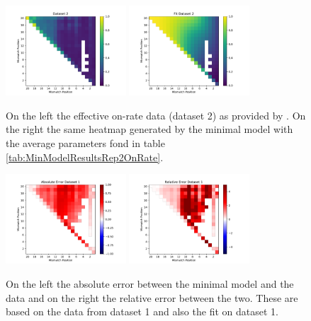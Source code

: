 \begin{figure}
\begin{center}
\includegraphics[width=0.4\textwidth]{images/OnRateDataset2}
\includegraphics[width=0.4\textwidth]{images/OnRateFitset2}
\caption{On the left the effective on-rate data (dataset 2) as provided by \cite{PNAS}. On the right the same heatmap generated by the minimal model with the average parameters fond in table \ref{tab:MinModelResultsRep2OnRate}.}
\label{fig:OnRateHMRep2}
\end{center}
\end{figure}


\begin{figure}
\begin{center}
\includegraphics[width=0.4\textwidth]{images/OnRateFitset1AbsError}
\includegraphics[width=0.4\textwidth]{images/OnRateFitset1RelError}
\caption{On the left the absolute error between the minimal model and the data and on the right the relative error between the two. These are based on the data from dataset 1 and also the fit on dataset 1.}
\label{fig:OnRateHMRep1Errors}
\end{center}
\end{figure}

